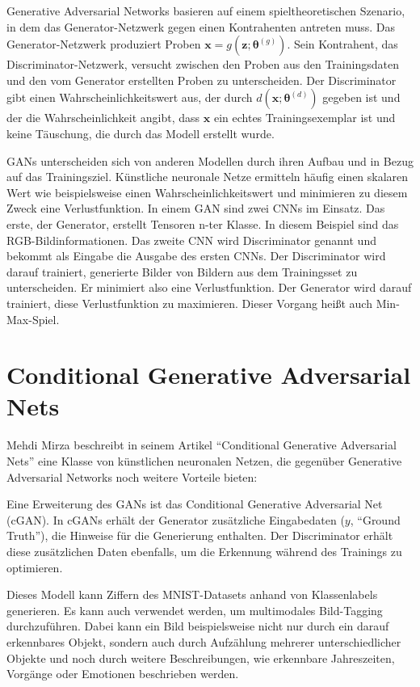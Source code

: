 Generative Adversarial Networks basieren auf einem spieltheoretischen Szenario, in dem das Generator-Netzwerk gegen einen Kontrahenten antreten muss. Das Generator-Netzwerk produziert Proben $\boldsymbol{x}=g(\boldsymbol{z}; \boldsymbol{\theta}^{(g)})$. Sein Kontrahent, das Discriminator-Netzwerk, versucht zwischen den Proben aus den Trainingsdaten und den vom Generator erstellten Proben zu unterscheiden. Der Discriminator gibt einen Wahrscheinlichkeitswert aus, der durch $d(\boldsymbol{x}; \boldsymbol{\theta}^{(d)})$ gegeben ist und der die Wahrscheinlichkeit angibt, dass $\boldsymbol{x}$ ein echtes Trainingsexemplar ist und keine Täuschung, die durch das Modell erstellt wurde. \cite{goodfellow2016deeplearning}

GANs unterscheiden sich von anderen Modellen durch ihren Aufbau und in Bezug auf das Trainingsziel. Künstliche neuronale Netze ermitteln häufig einen skalaren Wert wie beispielsweise einen Wahrscheinlichkeitswert und minimieren zu diesem Zweck eine Verlustfunktion. In einem GAN sind zwei CNNs im Einsatz. Das erste, der Generator, erstellt Tensoren n-ter Klasse. In diesem Beispiel sind das RGB-Bildinformationen. Das zweite CNN wird Discriminator genannt und bekommt als Eingabe die Ausgabe des ersten CNNs. Der Discriminator wird darauf trainiert, generierte Bilder von Bildern aus dem Trainingsset zu unterscheiden. Er minimiert also eine Verlustfunktion. Der Generator wird darauf trainiert, diese Verlustfunktion zu maximieren. Dieser Vorgang heißt auch Min-Max-Spiel. \cite{goodfellow2014generative}

\section{Conditional Generative Adversarial Nets}
\label{cgan}

Mehdi Mirza beschreibt in seinem Artikel ``Conditional Generative Adversarial Nets'' \cite{mirza2014conditional} eine Klasse von künstlichen neuronalen Netzen, die gegenüber Generative Adversarial Networks noch weitere Vorteile bieten:

Eine Erweiterung des GANs ist das Conditional Generative Adversarial Net (cGAN). In cGANs erhält der Generator zusätzliche Eingabedaten ($y$, ``Ground Truth''), die Hinweise für die Generierung enthalten. Der Discriminator erhält diese zusätzlichen Daten ebenfalls, um die Erkennung während des Trainings zu optimieren.

Dieses Modell kann Ziffern des MNIST-Datasets anhand von Klassenlabels generieren. Es kann auch verwendet werden, um multimodales Bild-Tagging durchzuführen. Dabei kann ein Bild beispielsweise nicht nur durch ein darauf erkennbares Objekt, sondern auch durch Aufzählung mehrerer unterschiedlicher Objekte und noch durch weitere Beschreibungen, wie erkennbare Jahreszeiten, Vorgänge oder Emotionen beschrieben werden.

